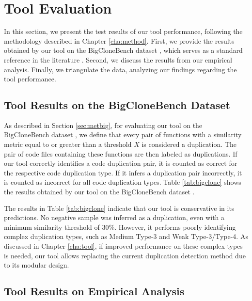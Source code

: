 \en 


\section{Tool Evaluation}
\label{sec:eval}

In this section, we present the test results of our tool performance, following the methodology described in Chapter \ref{cha:method}. First, we provide the results obtained by our tool on the BigCloneBench dataset \citep{bigclonebench}, which serves as a standard reference in the literature \citep{litreview}. Second, we discuss the results from our empirical analysis. Finally, we triangulate the data, analyzing our findings regarding the tool performance.

\subsection{Tool Results on the BigCloneBench Dataset}



As described in Section \ref{sec:metbig}, for evaluating our tool on the BigCloneBench dataset \citep{bigclonebench}, we define that every pair of functions with a similarity metric equal to or greater than a threshold \( X \) is considered a duplication. The pair of code files containing these functions are then labeled as duplications. If our tool correctly identifies a code duplication pair, it is counted as correct for the respective code duplication type. If it infers a duplication pair incorrectly, it is counted as incorrect for all code duplication types. Table \ref{tab:bigclone} shows the results obtained by our tool on the BigCloneBench dataset \citep{bigclonebench}.

The results in Table \ref{tab:bigclone} indicate that our tool is conservative in its predictions. No negative sample was inferred as a duplication, even with a minimum similarity threshold of 30\%. However, it performs poorly identifying complex duplication types, such as Medium Type-3 and Weak Type-3/Type-4. As discussed in Chapter \ref{cha:tool}, if improved performance on these complex types is needed, our tool allows replacing the current duplication detection method due to its modular design.

\subsection{Tool Results on Empirical Analysis}

